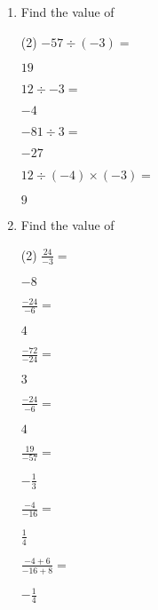 \begin{enumerate} [leftmargin=0cm]
\item Find the value of
\begin{tasks}[label=(\alph*), after-item-skip=2pt,after-skip=3pt, label-width=4ex](2)
    \task  $ -57 \div  (-3) =               $                           \begin{envFillIn}$  19      $    \end{envFillIn}
    \task  $ 12 \div  -3 =                  $                           \begin{envFillIn}$  -4      $    \end{envFillIn}
    \task  $ -81 \div  3 =                  $                           \begin{envFillIn}$  -27     $    \end{envFillIn}
    \task  $ 12 \div (-4) \times (-3)=      $                           \begin{envFillIn}$  9       $    \end{envFillIn}
\end{tasks}

\item Find the value of
\begin{tasks}[label=(\alph*), after-item-skip=2pt,after-skip=3pt, label-width=4ex](2)
    \task  $ \frac{24}{-3}=              $                              \begin{envFillIn}$  -8                $    \end{envFillIn}
    \task  $ \frac{-24}{-6}=             $                              \begin{envFillIn}$  4                 $    \end{envFillIn}
    \task  $ \frac{-72}{-24}=            $                              \begin{envFillIn}$  3                 $    \end{envFillIn}
    \task  $ \frac{-24}{-6}=             $                              \begin{envFillIn}$  4                 $    \end{envFillIn}
    \task  $ \frac{19}{-57}=             $                              \begin{envFillIn}$  -\frac{1}{3}      $    \end{envFillIn}
    \task  $ \frac{-4}{-16}=             $                              \begin{envFillIn}$  \frac{1}{4}       $    \end{envFillIn}
    \task  $ \frac{-4+6}{-16+8}=         $                              \begin{envFillIn}$  -\frac{1}{4}      $    \end{envFillIn}
\end{tasks}


\end{enumerate}

